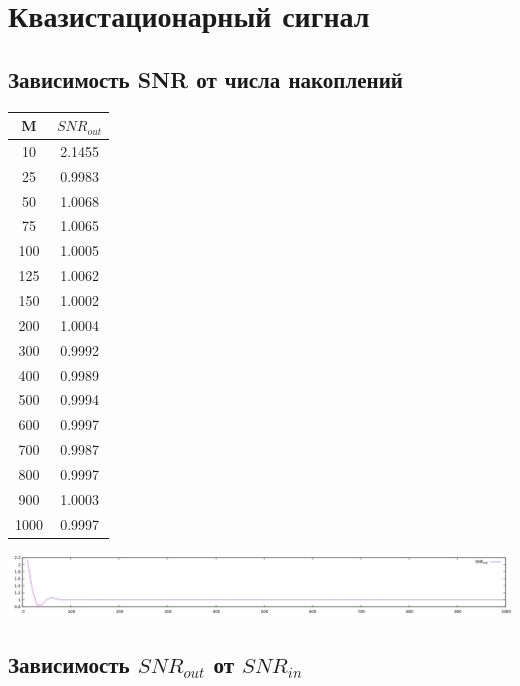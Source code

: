 \section{Квазистационарный сигнал}

\subsection{Зависимость SNR от числа накоплений}

\begin{tabular}{|c|c|}
\hline
M & $SNR_{out}$\\ \hline
10 & 2.1455\\ \hline
25 & 0.9983\\ \hline
50 & 1.0068\\ \hline
75 & 1.0065\\ \hline
100 & 1.0005\\ \hline
125 & 1.0062\\ \hline
150 & 1.0002\\ \hline
200 & 1.0004\\ \hline
300 & 0.9992\\ \hline
400 & 0.9989\\ \hline
500 & 0.9994\\ \hline
600 & 0.9997\\ \hline
700 & 0.9987\\ \hline
800 & 0.9997\\ \hline
900 & 1.0003\\ \hline
1000 & 0.9997\\ \hline
\end{tabular}

\includegraphics[width=\textwidth]{img/r3.png}

\subsection{Зависимость $SNR_{out}$ от $SNR_{in}$}


